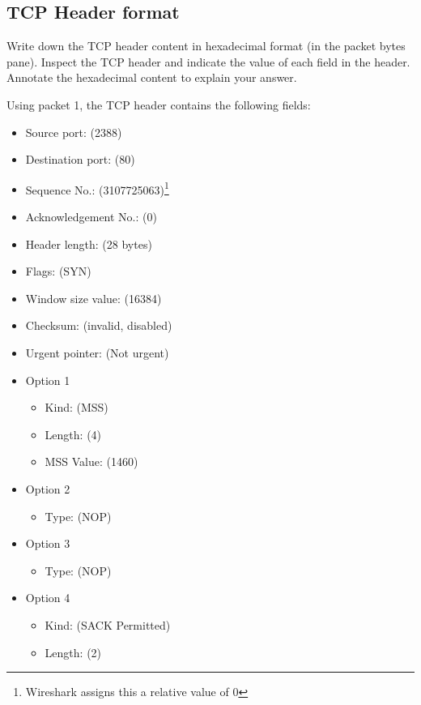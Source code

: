 \subsection{TCP Header format}
\begin{Question}
	Write down the TCP header content in hexadecimal format (in the packet bytes pane). Inspect the TCP header and indicate the value of each field in the header. Annotate the hexadecimal content to explain your answer.
\end{Question}
\begin{Answer}
	Using packet 1, the TCP header contains the following fields:
	\begin{itemize}
		\item Source port:  (2388)
		\item Destination port:  (80)
		\item Sequence No.:  (3107725063)\footnote{Wireshark assigns this a relative value of 0}
		\item Acknowledgement No.:  (0)
		\item Header length:  (28 bytes)
		\item Flags:  (SYN)
		\item Window size value:  (16384)
		\item Checksum:  (invalid, disabled)
		\item Urgent pointer:  (Not urgent)
		\item Option 1
		\begin{itemize}
			\item Kind:  (MSS)
			\item Length:  (4)
			\item MSS Value:  (1460)
		\end{itemize}
		\item Option 2
		\begin{itemize}
			\item Type:  (NOP)
		\end{itemize}
		\item Option 3
		\begin{itemize}
			\item Type:  (NOP)
		\end{itemize}
		\item Option 4
		\begin{itemize}
			\item Kind:  (SACK Permitted)
			\item Length:  (2)
		\end{itemize}
	\end{itemize}
\end{Answer}


